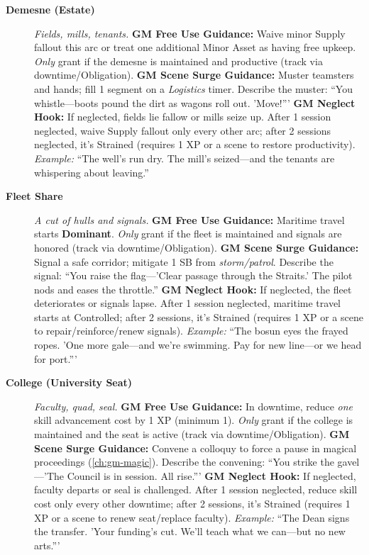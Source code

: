 \begin{description}
  \item[\textbf{Demesne (Estate)}]   
        \emph{Fields, mills, tenants.}  
        \textbf{GM Free Use Guidance:} Waive minor Supply fallout this arc or treat one additional Minor Asset as having free upkeep. \emph{Only} grant if the demesne is maintained and productive (track via downtime/Obligation).  
        \textbf{GM Scene Surge Guidance:} Muster teamsters and hands; fill 1 segment on a \emph{Logistics} timer. Describe the muster: ``You whistle---boots pound the dirt as wagons roll out. 'Move!'''  
        \textbf{GM Neglect Hook:} If neglected, fields lie fallow or mills seize up. After 1 session neglected, waive Supply fallout only every other arc; after 2 sessions neglected, it's Strained (requires 1 XP or a scene to restore productivity).  
        \textit{Example:} ``The well's run dry. The mill's seized---and the tenants are whispering about leaving.''  

  \item[\textbf{Fleet Share}]   
        \emph{A cut of hulls and signals.}  
        \textbf{GM Free Use Guidance:} Maritime travel starts \textbf{Dominant}. \emph{Only} grant if the fleet is maintained and signals are honored (track via downtime/Obligation).  
        \textbf{GM Scene Surge Guidance:} Signal a safe corridor; mitigate 1 SB from \emph{storm/patrol}. Describe the signal: ``You raise the flag---'Clear passage through the Straits.' The pilot nods and eases the throttle.''  
        \textbf{GM Neglect Hook:} If neglected, the fleet deteriorates or signals lapse. After 1 session neglected, maritime travel starts at Controlled; after 2 sessions, it's Strained (requires 1 XP or a scene to repair/reinforce/renew signals).  
        \textit{Example:} ``The bosun eyes the frayed ropes. 'One more gale---and we're swimming. Pay for new line---or we head for port.'''  

  \item[\textbf{College (University Seat)}]   
        \emph{Faculty, quad, seal.}  
        \textbf{GM Free Use Guidance:} In downtime, reduce \emph{one} skill advancement cost by 1 XP (minimum 1). \emph{Only} grant if the college is maintained and the seat is active (track via downtime/Obligation).  
        \textbf{GM Scene Surge Guidance:} Convene a colloquy to force a pause in magical proceedings (\ref{ch:gm-magic}). Describe the convening: ``You strike the gavel---'The Council is in session. All rise.'''  
        \textbf{GM Neglect Hook:} If neglected, faculty departs or seal is challenged. After 1 session neglected, reduce skill cost only every other downtime; after 2 sessions, it's Strained (requires 1 XP or a scene to renew seat/replace faculty).  
        \textit{Example:} ``The Dean signs the transfer. 'Your funding's cut. We'll teach what we can---but no new arts.'''  


\end{description}
